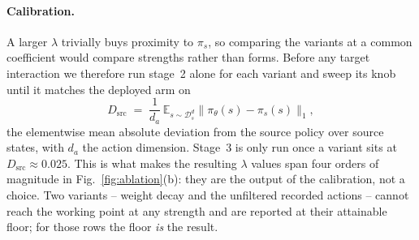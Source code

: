 \paragraph{Calibration.}
A larger $\lambda$ trivially buys proximity to $\pi_s$, so comparing the
variants at a common coefficient would compare strengths rather than forms.
Before any target interaction we therefore run stage~2 alone for each variant
and sweep its knob until it matches the deployed arm on
\begin{equation}
D_{\mathrm{src}} \;=\; \frac{1}{d_a}\,
\mathbb{E}_{s\sim\mathcal{D}^d_s}\big\lVert
\pi_\theta(s)-\pi_s(s)\big\rVert_1 ,
\label{eq:dsrc}
\end{equation}
the elementwise mean absolute deviation from the source policy over source
states, with $d_a$ the action dimension. Stage~3 is only run once a variant sits
at $D_{\mathrm{src}}\approx0.025$. This is what makes the resulting
$\lambda$ values span four orders of magnitude in
Fig.~\ref{fig:ablation}(b): they are the output of the calibration, not a
choice. Two variants -- weight decay and the unfiltered recorded actions --
cannot reach the working point at any strength and are reported at their
attainable floor; for those rows the floor \emph{is} the result.
